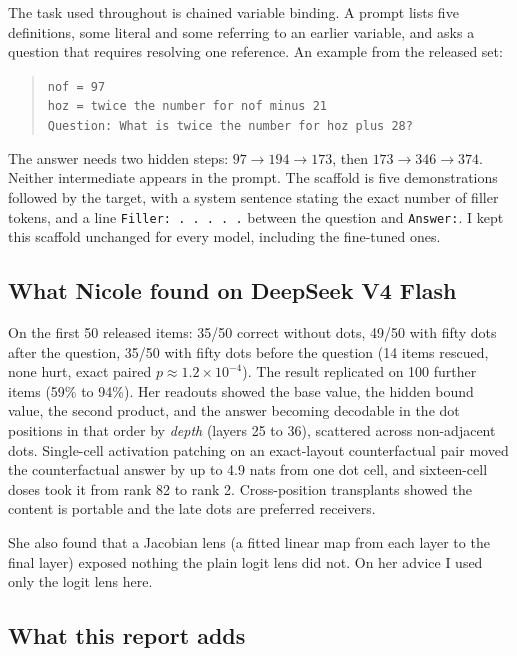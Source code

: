 \documentclass[11pt]{article}
\newcommand{\ttt}[1]{\texttt{\small #1}}
\begin{document}
The task used throughout is chained variable binding. A prompt lists five definitions, some literal and some referring to an earlier variable, and asks a question that requires resolving one reference. An example from the released set:

\begin{quote}\small\ttt{nof = 97}\\
\ttt{hoz = twice the number for nof minus 21}\\
\ttt{Question: What is twice the number for hoz plus 28?}\end{quote}

The answer needs two hidden steps: $97 \to 194 \to 173$, then $173 \to 346 \to 374$. Neither intermediate appears in the prompt. The scaffold is five demonstrations followed by the target, with a system sentence stating the exact number of filler tokens, and a line \ttt{Filler: . . . . .} between the question and \ttt{Answer:}. I kept this scaffold unchanged for every model, including the fine-tuned ones.

\subsection{What Nicole found on DeepSeek V4 Flash}

On the first 50 released items: 35/50 correct without dots, 49/50 with fifty dots after the question, 35/50 with fifty dots before the question (14 items rescued, none hurt, exact paired $p \approx 1.2 \times 10^{-4}$). The result replicated on 100 further items (59\% to 94\%). Her readouts showed the base value, the hidden bound value, the second product, and the answer becoming decodable in the dot positions in that order by \emph{depth} (layers 25 to 36), scattered across non-adjacent dots. Single-cell activation patching on an exact-layout counterfactual pair moved the counterfactual answer by up to 4.9 nats from one dot cell, and sixteen-cell doses took it from rank 82 to rank 2. Cross-position transplants showed the content is portable and the late dots are preferred receivers.

She also found that a Jacobian lens (a fitted linear map from each layer to the final layer) exposed nothing the plain logit lens did not. On her advice I used only the logit lens here.

\subsection{What this report adds}
\end{document}
